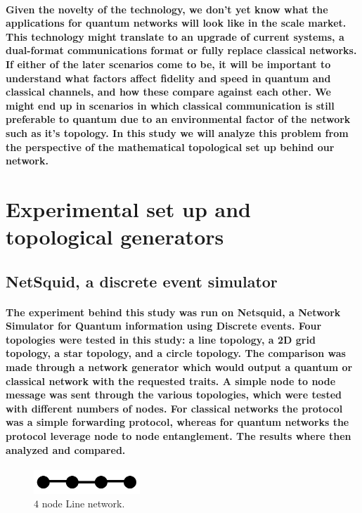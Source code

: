 \documentclass{article}
\begin{document}
    \paragraph{Given the novelty of the technology, we don't yet know what the applications for quantum networks will look like in the scale market. This technology might translate to an upgrade of current systems, a dual-format communications format or fully replace classical networks. 
    If either of the later scenarios come to be, it will be important to understand what factors affect fidelity and speed in quantum and classical channels, and how these compare against each other. We might end up in scenarios in which classical communication is still preferable to quantum due to an environmental factor of the network such as it's topology.
    In this study we will analyze this problem from the perspective of the mathematical topological set up behind our network.}


    \section{Experimental set up and topological generators}

    \subsection*{NetSquid, a discrete event simulator}
    \paragraph{The experiment behind this study was run on Netsquid\cite{Netsquid}, a Network Simulator for Quantum information using Discrete events.
    Four topologies were tested in this study: a line topology, a 2D grid topology, a star topology, and a circle topology. 
    The comparison was made through a network generator which would output a quantum or classical network with the requested traits.
    A simple node to node message was sent through the various topologies, which were tested with different numbers of nodes. 
    For classical networks the protocol was a simple forwarding protocol, whereas for quantum networks the protocol leverage node to node entanglement.
    The results where then analyzed and compared.
    }

    \begin{figure}
    \centering
    \includegraphics[width=4cm]{Line.png}
    \caption{\label{f1} $4$ node Line network.} 
    \end{figure}
\end{document}

